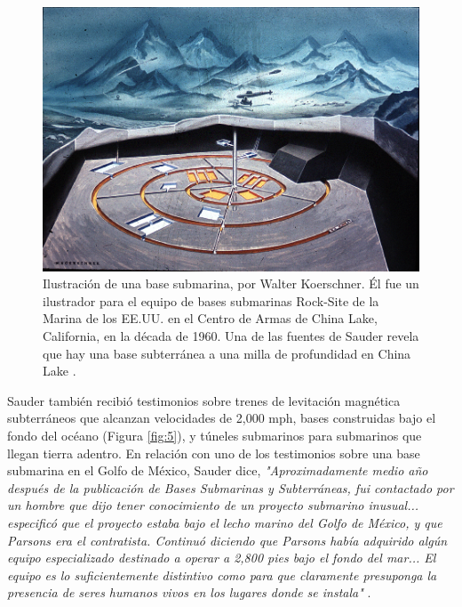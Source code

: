\documentclass[10pt,twocolumn,letterpaper]{article}
\begin{document}
\begin{figure}[t]
\begin{center}
   \includegraphics[width=1\linewidth]{undersea.jpg}
\end{center}
   \caption{Ilustración de una base submarina, por Walter Koerschner. Él fue un ilustrador para el equipo de bases submarinas Rock-Site de la Marina de los EE.UU. en el Centro de Armas de China Lake, California, en la década de 1960. Una de las fuentes de Sauder revela que hay una base subterránea a una milla de profundidad en China Lake \cite{22,23}.}
\label{fig:5}
\label{fig:onecol}
\end{figure}

Sauder también recibió testimonios sobre trenes de levitación magnética subterráneos que alcanzan velocidades de 2,000 mph, bases construidas bajo el fondo del océano (Figura \ref{fig:5}), y túneles submarinos para submarinos que llegan tierra adentro. En relación con uno de los testimonios sobre una base submarina en el Golfo de México, Sauder dice, \textit{"Aproximadamente medio año después de la publicación de Bases Submarinas y Subterráneas, fui contactado por un hombre que dijo tener conocimiento de un proyecto submarino inusual... especificó que el proyecto estaba bajo el lecho marino del Golfo de México, y que Parsons era el contratista. Continuó diciendo que Parsons había adquirido algún equipo especializado destinado a operar a 2,800 pies bajo el fondo del mar... El equipo es lo suficientemente distintivo como para que claramente presuponga la presencia de seres humanos vivos en los lugares donde se instala"} \cite{22}.
\end{document}
